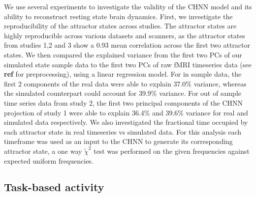 \documentclass{article}
\begin{document}
We use several experiments to investigate the validity of the CHNN model and its ability to reconstruct resting state
brain dynamics. First, we investigate the reproducibility  of the attractor states across studies.
The attractor states are highly reproducible across various datasets and scanners, as the attractor states from studies
1,2 and 3 show a 0.93 mean correlation across the first two attractor states.
We then compared the explained variance from the first two PCs of our simulated state sample data to the first two PCs of
raw fMRI timeseries data (see \textbf{ref} for preprocessing), using a linear regression model.
For in sample data, the first 2 components of the real data
were able to explain 37.0\% variance, whereas the simulated counterpart could account for 39.9\% variance. For out of
sample time series data from study 2, the first two principal components of the CHNN projection of study 1 were
able to explain 36.4\% and 39.6\% variance for real and simulated data respectively.
We also investigated the fractional time occupied by each attractor state in real timeseries vs simulated data. For
this analysis each timeframe was used as an input to the CHNN to generate its corresponding attractor state, a one
way $\tilde{\chi}^2$ test was performed on the given frequencies against expected uniform frequencies.

\subsection{Task-based activity}\label{Task-based activity}
\end{document}
